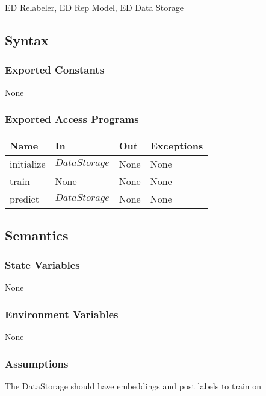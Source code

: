 \documentclass[12pt, titlepage]{article}
\begin{document}
ED Relabeler, ED Rep Model, ED Data Storage

\subsection{Syntax}

\subsubsection{Exported Constants}

None

\subsubsection{Exported Access Programs}

\begin{center}
\begin{tabular}{p{3cm} p{5cm} p{4cm} p{3cm}}
\hline
\textbf{Name} & \textbf{In} & \textbf{Out} & \textbf{Exceptions} \\
\hline
initialize & $DataStorage$ & None & None \\
train & None & None & None \\
predict & $DataStorage$ & None & None \\
\hline
\end{tabular}
\end{center}

\subsection{Semantics}

\subsubsection{State Variables}

None

\subsubsection{Environment Variables}

None

\subsubsection{Assumptions}

The DataStorage should have embeddings and post labels to train on
\end{document}
